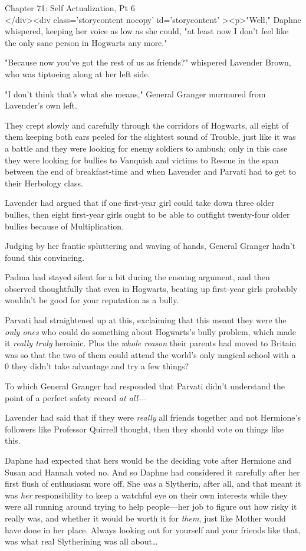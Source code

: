 
Chapter 71: Self Actualization, Pt 6\\
</div><div  class='storycontent nocopy' id='storycontent' ><p>"Well," Daphne 
whispered, keeping her voice as low as she could, "at least now I don't feel 
like the only sane person in Hogwarts any more."

"Because now you've got the rest of us as friends?" whispered Lavender Brown, 
who was tiptoeing along at her left side.

"I don't think that's what she means," General Granger murmured from Lavender's 
own left.

They crept slowly and carefully through the corridors of Hogwarts, all eight of 
them keeping both ears peeled for the slightest sound of Trouble, just like it 
was a battle and they were looking for enemy soldiers to ambush; only in this 
case they were looking for bullies to Vanquish and victims to Rescue in the 
span between the end of breakfast-time and when Lavender and Parvati had to get 
to their Herbology class.

Lavender had argued that if one first-year girl could take down three older 
bullies, then eight first-year girls ought to be able to outfight twenty-four 
older bullies because of Multiplication.

Judging by her frantic spluttering and waving of hands, General Granger hadn't 
found this convincing.

Padma had stayed silent for a bit during the ensuing argument, and then 
observed thoughtfully that even in Hogwarts, beating up first-year girls 
probably wouldn't be good for your reputation as a bully.

Parvati had straightened up at this, exclaiming that this meant they were the 
\emph{only ones} who could do something about Hogwarts's bully problem, which 
made it \emph{really truly} heroinic. Plus the \emph{whole reason} their 
parents had moved to Britain was so that the two of them could attend the 
world's only magical school with a 0%
they didn't take advantage and try a few things?

To which General Granger had responded that Parvati didn't understand the point 
of a perfect safety record \emph{at all}---

Lavender had said that if they were \emph{really} all friends together and not 
Hermione's followers like Professor Quirrell thought, then they should vote on 
things like this.

Daphne had expected that hers would be the deciding vote after Hermione and 
Susan and Hannah voted no. And so Daphne had considered it carefully after her 
first flush of enthusiasm wore off. She \emph{was} a Slytherin, after all, and 
that meant it was \emph{her} responsibility to keep a watchful eye on their own 
interests while they were all running around trying to help people---her job to 
figure out how risky it really was, and whether it would be worth it for 
\emph{them}, just like Mother would have done in her place. Always looking out 
for yourself and your friends like that, was what real Slytherining was all 
about{\ldots}

